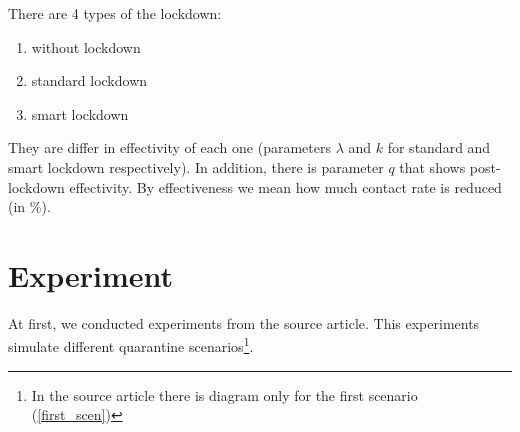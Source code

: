 \documentclass[12pt,a4paper,english]{article}
\begin{document}
    There are 4 types of the lockdown:
    \begin{enumerate}
        \item without lockdown
        \item standard lockdown
        \item smart lockdown
    \end{enumerate}
    \noindent They are differ in effectivity of each one (parameters $\lambda$ and $k$ for standard and smart lockdown respectively). 
    In addition, there is parameter $q$ that shows post-lockdown effectivity.
    By effectiveness we mean how much contact rate is reduced (in \%).

    \section{Experiment}
    At first, we conducted experiments from the source article.
    This experiments simulate different quarantine scenarios\footnote{In the source article there is diagram only for the first scenario (\ref{first_scen})}.
\end{document}
